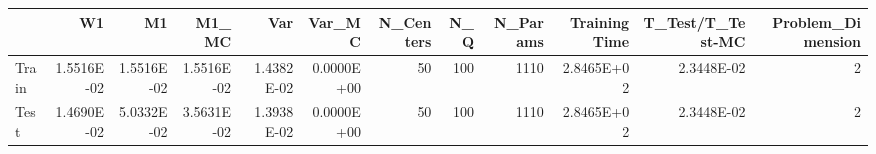 \begin{tabular}{lrrrrrrrrrrr}
\toprule
{} &         W1 &         M1 &      M1\_MC &        Var &     Var\_MC &  N\_Centers &  N\_Q &  N\_Params &  Training Time &  T\_Test/T\_Test-MC &  Problem\_Dimension \\
\midrule
Train & 1.5516E-02 & 1.5516E-02 & 1.5516E-02 & 1.4382E-02 & 0.0000E+00 &         50 &  100 &      1110 &     2.8465E+02 &        2.3448E-02 &                  2 \\
Test  & 1.4690E-02 & 5.0332E-02 & 3.5631E-02 & 1.3938E-02 & 0.0000E+00 &         50 &  100 &      1110 &     2.8465E+02 &        2.3448E-02 &                  2 \\
\bottomrule
\end{tabular}
